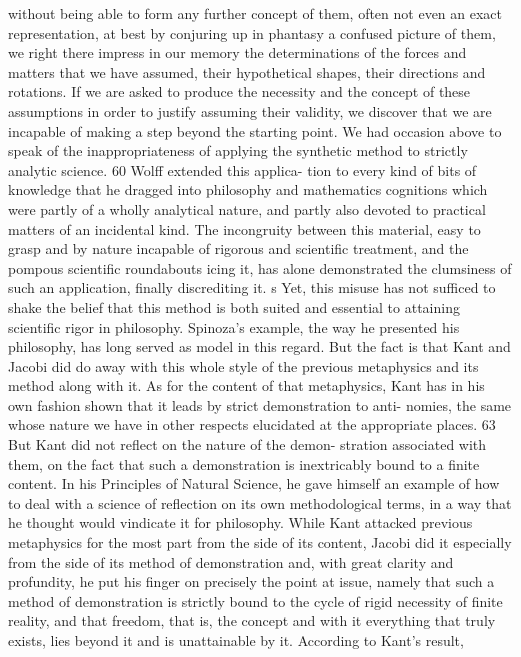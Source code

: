 without being able to form any further concept of them, often not even
an exact representation, at best by conjuring up in phantasy a confused
picture of them, we right there impress in our memory the determinations
of the forces and matters that we have assumed, their hypothetical shapes,
their directions and rotations. If we are asked to produce the necessity and
the concept of these assumptions in order to justify assuming their validity,
we discover that we are incapable of making a step beyond the starting
point.
We had occasion above to speak of the inappropriateness of applying the
synthetic method to strictly analytic science. 60 Wolff extended this applica-
tion to every kind of bits of knowledge that he dragged into philosophy and
mathematics
cognitions which were partly of a wholly analytical nature,
and partly also devoted to practical matters of an incidental kind. The
incongruity between this material, easy to grasp and by nature incapable of
rigorous and scientific treatment, and the pompous scientific roundabouts
icing it, has alone demonstrated the clumsiness of such an application,
finally discrediting it. s Yet, this misuse has not sufficed to shake the belief
that this method is both suited and essential to attaining scientific rigor
in philosophy. Spinoza's example, the way he presented his philosophy, has
long served as model in this regard. But the fact is that Kant and Jacobi
did do away with this whole style of the previous metaphysics and its
method along with it. As for the content of that metaphysics, Kant has
in his own fashion shown that it leads by strict demonstration to anti-
nomies, the same whose nature we have in other respects elucidated at the
appropriate places. 63 But Kant did not reflect on the nature of the demon-
stration associated with them, on the fact that such a demonstration is
inextricably bound to a finite content. In his Principles of Natural Science,
he gave himself an example of how to deal with a science of reflection on
its own methodological terms, in a way that he thought would vindicate
it for philosophy.
While Kant attacked previous metaphysics for the
most part from the side of its content, Jacobi did it especially from the side
of its method of demonstration and, with great clarity and profundity, he
put his finger on precisely the point at issue, namely that such a method
of demonstration is strictly bound to the cycle of rigid necessity of finite
reality, and that freedom, that is, the concept and with it everything that truly
exists, lies beyond it and is unattainable by it.
According to Kant's result,
